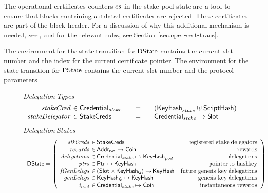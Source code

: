 The operational certificates counters $\mathit{cs}$ in the stake pool state are a
tool to ensure that blocks containing outdated certificates are rejected.
These certificates are part of the block header.
For a discussion of why this additional mechanism is needed,
see \cite{delegation_design}, and for
the relevant rules, see Section \ref{sec:oper-cert-trans}.

The environment for the state transition for $\mathsf{DState}$ contains the current slot number
and the index for the current certificate pointer.
The environment for the state transition for $\mathsf{PState}$ contains the current slot number
and the protocol parameters.

\begin{figure}
  \emph{Delegation Types}
  \begin{equation*}
    \begin{array}{r@{~\in~}l@{\qquad=\qquad}lr}
      \var{stakeCred} & \StakeCredential & (\KeyHash_{stake} \uniondistinct
                                       \HashScr) \\
      \var{stakeDelegator} & \StakeCreds & \StakeCredential \mapsto \Slot \\
    \end{array}
  \end{equation*}
  \emph{Delegation States}
  \begin{equation*}
    \begin{array}{l}
    \DState =
    \left(\begin{array}{r@{~\in~}lr}
            \var{stkCreds} & \StakeCreds & \text{registered stake delegators}\\
            \var{rewards} & \AddrRWD \mapsto \Coin & \text{rewards}\\
            \var{delegations} & \StakeCredential \mapsto \KeyHash_{pool} & \text{delegations}\\
            \var{ptrs} & \Ptr \mapsto \KeyHash & \text{pointer to hashkey}\\
            \var{fGenDelegs} & (\Slot\times\KeyHashGen) \mapsto \KeyHash & \text{future genesis key delegations}\\
            \var{genDelegs} & \KeyHashGen \mapsto \KeyHash & \text{genesis key delegations}\\
            \var{i_{rwd}} & \StakeCredential \mapsto \Coin & \text{instantaneous rewards}\\
          \end{array}
      \right)
      \\

\end{array}
\end{equation*}
\end{figure}
